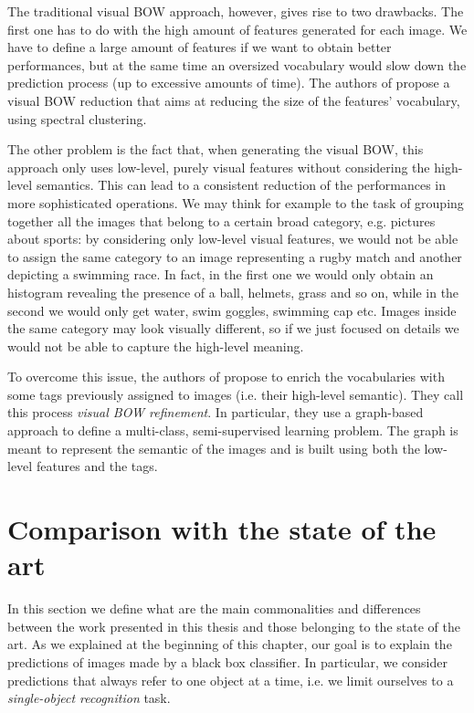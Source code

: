\documentclass[12pt, twoside, a4paper]{report}
\begin{document}
The traditional visual BOW approach, however, gives rise to two drawbacks. The first one has to do with the high amount of features generated for each image. We have to define a large amount of features if we want to obtain better performances, but at the same time an oversized vocabulary would slow down the prediction process (up to excessive amounts of time). The authors of \cite{visual-bag-of-words} propose a visual BOW reduction that aims at reducing the size of the features' vocabulary, using spectral clustering. 



The other problem is the fact that, when generating the visual BOW, this approach only uses low-level, purely visual features without considering the high-level semantics. This can lead to a consistent reduction of the performances in more sophisticated operations. 
We may think for example to the task of grouping together all the images that belong to a certain broad category, e.g. pictures about sports: by considering only low-level visual features, we would not be able to assign the same category to an image representing a rugby match and another depicting a swimming race. In fact, in the first one we would only obtain an histogram revealing the presence of a ball, helmets, grass and so on, while in the second we would only get water, swim goggles, swimming cap etc. Images inside the same category may look visually different, so if we just focused on details we would not be able to capture the high-level meaning.

To overcome this issue, the authors of \cite{visual-bag-of-words} propose to enrich the vocabularies with some tags previously assigned to images (i.e. their high-level semantic). They call this process \textit{visual BOW refinement}. In particular, they use a graph-based approach to define a multi-class, semi-supervised learning problem. The graph is meant to represent the semantic of the images and is built using both the low-level features and the tags.


\section{Comparison with the state of the art}

In this section we define what are the main commonalities and differences between the work presented in this thesis and those belonging to the state of the art.
As we explained at the beginning of this chapter, our goal is to explain the predictions of images made by a black box classifier. In particular, we consider predictions that always refer to one object at a time, i.e. we limit ourselves to a \textit{single-object recognition} task. 
\end{document}
